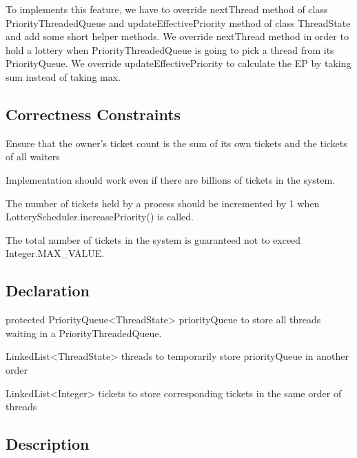 \documentclass{article}
\begin{document}
\begin{spacing}{1.1}
To implements this feature, we have to override \textsf{nextThread} method of class \textsf{PriorityThreadedQueue} and \textsf{updateEffectivePriority} method of class \textsf{ThreadState} and add some short helper methods. We override \textsf{nextThread} method in order to hold a lottery when \textsf{PriorityThreadedQueue} is going to pick a thread from its \textsf{PriorityQueue}. We override \textsf{updateEffectivePriority} to calculate the EP by taking sum instead of taking max.

\subsection{Correctness Constraints}

\begin{asparaitem}
\item Ensure that the owner's ticket count is the sum of its own tickets and the tickets of all waiters
\item Implementation should work even if there are billions of tickets in the system.
\item The number of tickets held by a process should be incremented by 1 when \textsf{LotteryScheduler.increasePriority()} is called.
\item The total number of tickets in the system is guaranteed not to exceed \textsf{Integer.MAX}\_\textsf{VALUE}.
\end{asparaitem}

\subsection{Declaration}

\textsf{protected PriorityQueue<ThreadState> priorityQueue} to store all threads waiting in a \textsf{PriorityThreadedQueue}.

\textsf{LinkedList<ThreadState> threads} to temporarily store \textsf{priorityQueue} in another order

\textsf{LinkedList<Integer> tickets} to store corresponding tickets in the same order of \textsf{threads}

\subsection{Description}


\end{spacing}
\end{document}
